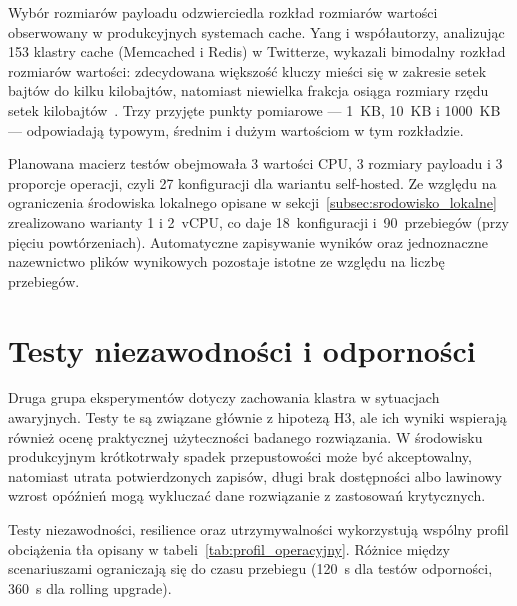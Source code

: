 Wybór rozmiarów payloadu odzwierciedla rozkład rozmiarów wartości obserwowany w produkcyjnych systemach cache. Yang i współautorzy, analizując 153 klastry cache (Memcached i Redis) w Twitterze, wykazali bimodalny rozkład rozmiarów wartości: zdecydowana większość kluczy mieści się w zakresie setek bajtów do kilku kilobajtów, natomiast niewielka frakcja osiąga rozmiary rzędu setek kilobajtów~\cite{yang2020}. Trzy przyjęte punkty pomiarowe --- 1~KB, 10~KB i 1000~KB --- odpowiadają typowym, średnim i dużym wartościom w tym rozkładzie.

Planowana macierz testów obejmowała 3 wartości CPU, 3 rozmiary payloadu i 3 proporcje operacji, czyli 27 konfiguracji dla wariantu self-hosted. Ze względu na ograniczenia środowiska lokalnego opisane w sekcji~\ref{subsec:srodowisko_lokalne} zrealizowano warianty 1 i 2~vCPU, co daje 18~konfiguracji i~90~przebiegów (przy pięciu powtórzeniach). Automatyczne zapisywanie wyników oraz jednoznaczne nazewnictwo plików wynikowych pozostaje istotne ze względu na liczbę przebiegów.

\section{Testy niezawodności i odporności}

Druga grupa eksperymentów dotyczy zachowania klastra w sytuacjach awaryjnych. Testy te są związane głównie z hipotezą H3, ale ich wyniki wspierają również ocenę praktycznej użyteczności badanego rozwiązania. W środowisku produkcyjnym krótkotrwały spadek przepustowości może być akceptowalny, natomiast utrata potwierdzonych zapisów, długi brak dostępności albo lawinowy wzrost opóźnień mogą wykluczać dane rozwiązanie z zastosowań krytycznych.

Testy niezawodności, resilience oraz utrzymywalności wykorzystują wspólny profil obciążenia tła opisany w tabeli~\ref{tab:profil_operacyjny}. Różnice między scenariuszami ograniczają się do czasu przebiegu (120~s dla testów odporności, 360~s dla rolling upgrade).

